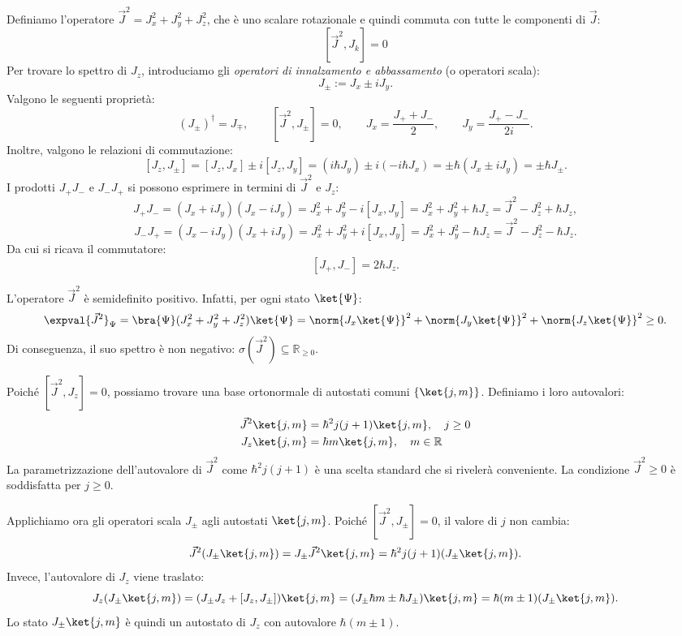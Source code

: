 Definiamo l'operatore \(\vec{J}^2 = J_x^2 + J_y^2 + J_z^2\), che è uno scalare rotazionale e quindi commuta con tutte le componenti di \(\vec{J}\):
\[
    [\vec{J}^2, J_k] = 0
\]
Per trovare lo spettro di \(J_z\), introduciamo gli \textit{operatori di innalzamento e abbassamento} (o operatori scala):
\begin{equation}
    J_\pm := J_x \pm i J_y.
\end{equation}
Valgono le seguenti proprietà:
\[
    (J_\pm)^\dagger = J_\mp, \qquad \left[ \vec{J}^2, J_\pm \right] = 0, \qquad J_x = \frac{J_+ + J_-}{2}, \qquad J_y = \frac{J_+ - J_-}{2i}.
\]
Inoltre, valgono le relazioni di commutazione:
\[
    [J_z, J_\pm] = [J_z, J_x] \pm i[J_z, J_y]
    = (i\hbar J_y) \pm i(-i\hbar J_x) = \pm \hbar (J_x \pm i J_y) = \pm \hbar J_\pm.
\]
I prodotti \(J_+ J_-\) e \(J_- J_+\) si possono esprimere in termini di \(\vec{J}^2\) e \(J_z\):
\[
    J_+ J_- = (J_x + i J_y)(J_x - i J_y) = J_x^2 + J_y^2 - i[J_x, J_y] = J_x^2 + J_y^2 + \hbar J_z = \vec{J}^2 - J_z^2 + \hbar J_z,
\]
\[
    J_- J_+ = (J_x - i J_y)(J_x + i J_y) = J_x^2 + J_y^2 + i[J_x, J_y] = J_x^2 + J_y^2 - \hbar J_z = \vec{J}^2 - J_z^2 - \hbar J_z.
\]
Da cui si ricava il commutatore:
\[
    [J_+, J_-] = 2\hbar J_z.
\]

L'operatore \(\vec{J}^2\) è semidefinito positivo. Infatti, per ogni stato \(\ket{\Psi}\):
\[
    \expval{\vec{J}^2}_\Psi = \bra{\Psi} (J_x^2 + J_y^2 + J_z^2) \ket{\Psi}
    = \norm{J_x \ket{\Psi}}^2 + \norm{J_y \ket{\Psi}}^2 + \norm{J_z \ket{\Psi}}^2 \ge 0.
\]
Di conseguenza, il suo spettro è non negativo: \(\sigma(\vec{J}^2) \subseteq \mathbb{R}_{\ge 0}\).

Poiché \([\vec{J}^2, J_z]=0\), possiamo trovare una base ortonormale di autostati comuni \(\left\{ \ket{j, m} \right\}\).
Definiamo i loro autovalori:
\begin{align}
    \vec{J}^2 \ket{j, m} &= \hbar^2 j(j+1) \ket{j, m}, \quad j \ge 0 \\
    J_z \ket{j, m} &= \hbar m \ket{j, m}, \quad m \in \mathbb{R}
\end{align}
La parametrizzazione dell'autovalore di \(\vec{J}^2\) come \(\hbar^2 j(j+1)\) è una scelta standard che si rivelerà conveniente. La condizione \(\vec{J}^2 \ge 0\) è soddisfatta per \(j \ge 0\).

Applichiamo ora gli operatori scala \(J_\pm\) agli autostati \(\ket{j,m}\). Poiché \([\vec{J}^2, J_\pm]=0\), il valore di \(j\) non cambia:
\[
    \vec{J}^2 (J_\pm \ket{j, m}) = J_\pm \vec{J}^2 \ket{j, m} = \hbar^2 j(j+1) (J_\pm \ket{j, m}).
\]
Invece, l'autovalore di \(J_z\) viene traslato:
\[
    J_z (J_\pm \ket{j, m}) = (J_\pm J_z + [J_z, J_\pm]) \ket{j, m}
    = (J_\pm \hbar m \pm \hbar J_\pm) \ket{j, m}
    = \hbar (m \pm 1) (J_\pm \ket{j, m}).
\]
Lo stato \(J_\pm \ket{j, m}\) è quindi un autostato di \(J_z\) con autovalore \(\hbar(m\pm 1)\).

